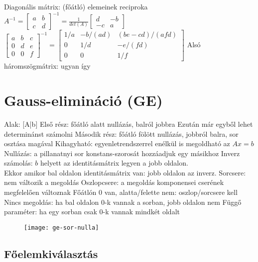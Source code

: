 \documentclass[12pt,a4paper]{article}
\begin{document}
\begin{outline}
	\1 Diagonális mátrix: (főátló) elemeinek reciproka
	\1 $A^{-1} = \begin{bmatrix} a & b \\ c & d \end{bmatrix}^{-1} =
	\frac{1}{det(A)} \begin{bmatrix} d & -b \\ -c & a \end{bmatrix}$
	\1 $\begin{bmatrix} a & b & c \\ 0 & d & e \\ 0 & 0 & f \end{bmatrix}^{-1}
	= \begin{bmatrix} 1/a & -b/(ad) & (be-cd)/(afd) \\ 0 & 1/d & -e/(fd) \\ 0 & 0 & 1/f \end{bmatrix}$
		\2 Alsó háromszögmátrix: ugyan így
\end{outline}

\pagebreak

\section{Gauss-elimináció (GE)}

\begin{outline}
	\1 Alak: [A|b]
	\1 Első rész: főátló alatt nullázás, balról jobbra
		\2 Ezután már egyből lehet determinánst számolni
	\1 Második rész: főátló fölött nullázás, jobbról balra, sor osztása magával
		\2 Kihagyható: egyenletrendszerrel enélkül is megoldható az $Ax=b$
	\1 Nullázás: a pillanatnyi sor konstans-szorosát hozzáadjuk egy másikhoz
	\1 Inverz számolás: $b$ helyett az identitásmátrix legyen a jobb oldalon.\\
	Ekkor amikor bal oldalon identitásmátrix van: jobb oldalon az inverz.
	\1 Sorcsere: nem változik a megoldás
	\1 Oszlopcsere: a megoldás komponensei cserének megfelelően változnak
	\1 Főátlón 0 van, alatta/felette nem: oszlop/sorcsere kell
	\1 Nincs megoldás: ha bal oldalon 0-k vannak a sorban, jobb oldalon nem
	\1 Függő paraméter: ha egy sorban csak 0-k vannak mindkét oldalt
\end{outline}

\begin{figure}[h!]
	\centering
	\texttt{[image: ge-sor-nulla]}
\end{figure}

\subsection{Főelemkiválasztás}
\end{document}
